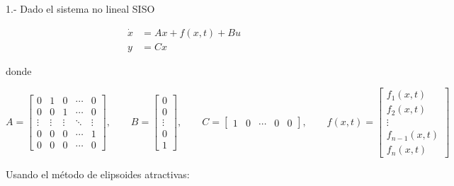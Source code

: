 \small
\vspace{0.5cm}

1.- Dado el sistema no lineal SISO

\begin{equation*}
    \begin{aligned}
        \dot{x}&= Ax+f(x,t)+Bu \\
        y&= Cx
    \end{aligned}
\end{equation*}

donde

\begin{equation*}
    A = \begin{bmatrix}
        0 & 1 & 0 & \cdots & 0 \\
        0 & 0 & 1 & \cdots & 0 \\
        \vdots & \vdots & \vdots & \ddots & \vdots \\
        0 & 0 & 0 & \cdots & 1 \\
        0 & 0 & 0 & \cdots & 0
    \end{bmatrix}, \qquad
    B = \begin{bmatrix}
        0 \\
        0 \\
        \vdots \\
                0 \\
        1
    \end{bmatrix}, \qquad
    C = \begin{bmatrix}
        1 & 0  & \cdots & 0 & 0
    \end{bmatrix}, \qquad
    f(x,t) = \begin{bmatrix}
        f_1(x,t) \\
        f_2(x,t) \\
        \vdots \\
        f_{n-1}(x,t) \\
        f_n(x,t)
    \end{bmatrix}
\end{equation*}

Usando el método de elipsoides atractivas:

